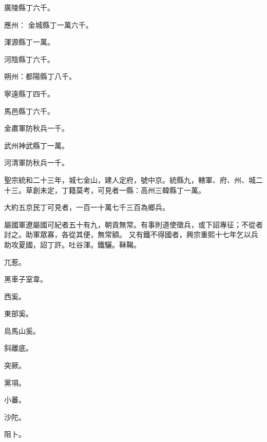\begin{pinyinscope}
 廣陵縣丁六千。



 應州：
 金城縣丁一萬六千。



 渾源縣丁一萬。



 河陰縣丁六千。



 朔州：都陽縣丁八千。



 寧遠縣丁四千。



 馬邑縣丁六千。



 金肅軍防秋兵一千。



 武州神武縣丁一萬。



 河清軍防秋兵一千。



 聖宗統和二十三年，城七金山，建人定府，號中京。統縣九，轄軍、府、州、城二十三。草創未定，丁籍莫考，可見者一縣：高州三韓縣丁一萬。



 大約五京民丁可見者，一百一十萬七千三百為鄉兵。



 屬國軍遼屬國可紀者五十有九，朝貢無常。有事則道使徵兵，或下詔專征；不從者討之。助軍眾寡，各從其便，無常額。
 又有鐵不得國者，興宗重熙十七年乞以兵助攻夏國，詔丁許。吐谷渾。鐵驪。靺鞨。



 兀惹。



 黑車子室韋。



 西奚。



 東部奚。



 烏馬山奚。



 斜離底。



 突厥。



 黨項。



 小蕃。



 沙陀。



 阻卜。




\end{pinyinscope}
